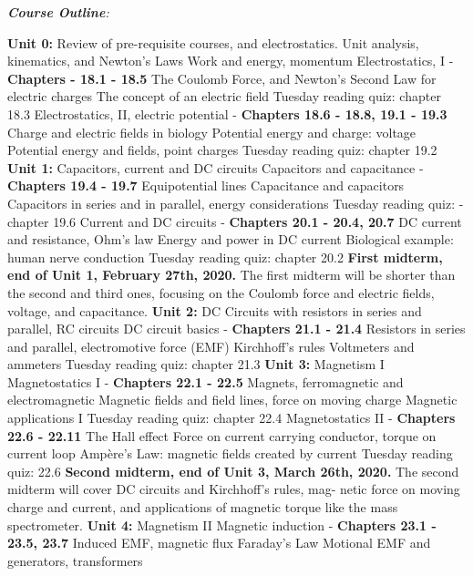 \documentclass[10pt]{article}
\begin{document}
\clearpage
\small
\textit{\textbf{Course Outline}:}
\begin{outline}[enumerate]
\1 \textbf{Unit 0:} Review of pre-requisite courses, and electrostatics.
\2 Unit analysis, kinematics, and Newton's Laws
\2 Work and energy, momentum
\2 Electrostatics, I - \textbf{Chapters - 18.1 - 18.5}
\3 The Coulomb Force, and Newton's Second Law for electric charges
\3 The concept of an electric field
\3 Tuesday reading quiz: chapter 18.3
\2 Electrostatics, II, electric potential - \textbf{Chapters 18.6 - 18.8, 19.1 - 19.3}
\3 Charge and electric fields in biology
\3 Potential energy and charge: voltage
\3 Potential energy and fields, point charges
\3 Tuesday reading quiz: chapter 19.2
\1 \textbf{Unit 1:} Capacitors, current and DC circuits
\2 Capacitors and capacitance - \textbf{Chapters 19.4 - 19.7}
\3 Equipotential lines
\3 Capacitance and capacitors
\3 Capacitors in series and in parallel, energy considerations
\3 Tuesday reading quiz: - chapter 19.6
\2 Current and DC circuits - \textbf{Chapters 20.1 - 20.4, 20.7}
\3 DC current and resistance, Ohm's law
\3 Energy and power in DC current
\3 Biological example: human nerve conduction
\3 Tuesday reading quiz: chapter 20.2
\1 \textbf{First midterm, end of Unit 1, February 27th, 2020.} The first midterm will be shorter than the second and third ones, focusing on the Coulomb force and electric fields, voltage, and capacitance.
\1 \textbf{Unit 2:} DC Circuits with resistors in series and parallel, RC circuits
\2 DC circuit basics - \textbf{Chapters 21.1 - 21.4}
\3 Resistors in series and parallel, electromotive force (EMF)
\3 Kirchhoff's rules
\3 Voltmeters and ammeters
\3 Tuesday reading quiz: chapter 21.3
\1 \textbf{Unit 3:} Magnetism I
\2 Magnetostatics I - \textbf{Chapters 22.1 - 22.5}
\3 Magnets, ferromagnetic and electromagnetic
\3 Magnetic fields and field lines, force on moving charge
\3 Magnetic applications I
\3 Tuesday reading quiz: chapter 22.4
\2 Magnetostatics II - \textbf{Chapters 22.6 - 22.11}
\3 The Hall effect
\3 Force on current carrying conductor, torque on current loop
\3 Amp\`{e}re's Law: magnetic fields created by current
\3 Tuesday reading quiz: 22.6
\1 \textbf{Second midterm, end of Unit 3, March 26th, 2020.} The second midterm will cover DC circuits and Kirchhoff’s rules, mag-
netic force on moving charge and current, and applications of magnetic torque like the mass spectrometer.
\1 \textbf{Unit 4:} Magnetism II
\2 Magnetic induction - \textbf{Chapters 23.1 - 23.5, 23.7}
\3 Induced EMF, magnetic flux
\3 Faraday's Law
\3 Motional EMF and generators, transformers

\end{outline}
\end{document}
